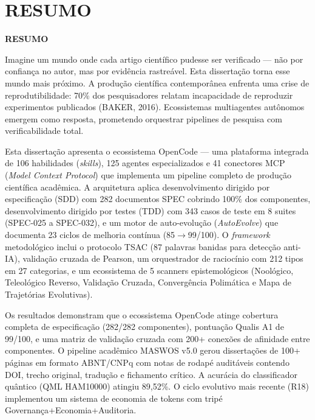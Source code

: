 \chapter*{RESUMO}
\thispagestyle{empty}

\begin{center}
  {\Large\bfseries RESUMO\par}
\end{center}
\vspace{1cm}

Imagine um mundo onde cada artigo científico pudesse ser verificado — não por confiança no autor, mas por evidência rastreável. Esta dissertação torna esse mundo mais próximo. A produção científica contemporânea enfrenta uma crise de reprodutibilidade: 70\% dos pesquisadores relatam incapacidade de reproduzir experimentos publicados (BAKER, 2016). Ecossistemas multiagentes autônomos emergem como resposta, prometendo orquestrar pipelines de pesquisa com verificabilidade total.

Esta dissertação apresenta o ecossistema OpenCode --- uma plataforma integrada de 106 habilidades (\textit{skills}), 125 agentes especializados e 41 conectores MCP (\textit{Model Context Protocol}) que implementa um pipeline completo de produção científica acadêmica. A arquitetura aplica desenvolvimento dirigido por especificação (SDD) com 282 documentos SPEC cobrindo 100\% dos componentes, desenvolvimento dirigido por testes (TDD) com 343 casos de teste em 8 suites (SPEC-025 a SPEC-032), e um motor de auto-evolução (\textit{AutoEvolve}) que documenta 23 ciclos de melhoria contínua (85$\rightarrow$99/100). O \textit{framework} metodológico inclui o protocolo TSAC (87 palavras banidas para detecção anti-IA), validação cruzada de Pearson, um orquestrador de raciocínio com 212 tipos em 27 categorias, e um ecossistema de 5 scanners epistemológicos (Noológico, Teleológico Reverso, Validação Cruzada, Convergência Polimática e Mapa de Trajetórias Evolutivas).

Os resultados demonstram que o ecossistema OpenCode atinge cobertura completa de especificação (282/282 componentes), pontuação Qualis A1 de 99/100, e uma matriz de validação cruzada com 200+ conexões de afinidade entre componentes. O pipeline acadêmico MASWOS v5.0 gerou dissertações de 100+ páginas em formato ABNT/CNPq com notas de rodapé auditáveis contendo DOI, trecho original, tradução e fichamento crítico. A acurácia do classificador quântico (QML HAM10000) atingiu 89,52\%. O ciclo evolutivo mais recente (R18) implementou um sistema de economia de tokens com tripé Governança+Economia+Auditoria.

